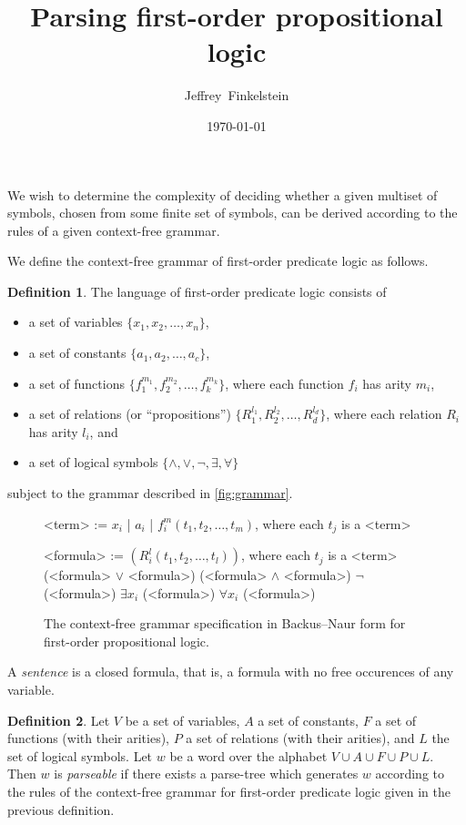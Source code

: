 \documentclass[draft]{article}
\author{Jeffrey~Finkelstein}
\title{Parsing first-order propositional logic}
\date{\today}
\theoremstyle{definition}
\newtheorem{definition}{Definition}
\begin{document}
\maketitle

We wish to determine the complexity of deciding whether a given multiset of symbols, chosen from some finite set of symbols, can be derived according to the rules of a given context-free grammar.

We define the context-free grammar of first-order predicate logic as follows.
\begin{definition}
  The language of first-order predicate logic consists of
  \begin{itemize}
  \item a set of variables $\{x_1, x_2, \ldots, x_n\}$,
  \item a set of constants $\{a_1, a_2, \ldots, a_c\}$,
  \item a set of functions $\{f^{m_1}_1, f^{m_2}_2, \ldots, f^{m_k}_k\}$, where each function $f_i$ has arity $m_i$,
  \item a set of relations (or ``propositions'') $\{R^{l_1}_1, R^{l_2}_2, \ldots, R^{l_d}_d\}$, where each relation $R_i$ has arity $l_i$, and
  \item a set of logical symbols $\{\land, \lor, \lnot, \exists, \forall\}$
  \end{itemize}
  subject to the grammar described in \autoref{fig:grammar}.
  \begin{figure}
    \caption{\label{fig:grammar}The context-free grammar specification in Backus--Naur form for first-order propositional logic.}
  \begin{grammar}
    <term> := $x_i$ | $a_i$ | $f^m_i(t_1, t_2, \ldots, t_m)$, where each $t_j$ is a <term>

    <formula> := $(R^l_i(t_1, t_2, \ldots, t_l))$, where each $t_j$ is a <term>
    \alt (<formula> $\lor$ <formula>)
    \alt (<formula> $\land$ <formula>)
    \alt $\lnot$ (<formula>)
    \alt $\exists x_i$ (<formula>)
    \alt $\forall x_i$ (<formula>)
  \end{grammar}
  \end{figure}
  A \emph{sentence} is a closed formula, that is, a formula with no free occurences of any variable.
\end{definition}
\begin{definition}
  Let $V$ be a set of variables, $A$ a set of constants, $F$ a set of functions (with their arities), $P$ a set of relations (with their arities), and $L$ the set of logical symbols.
  Let $w$ be a word over the alphabet $V\cup A\cup F\cup P\cup L$.
  Then $w$ is \emph{parseable} if there exists a parse-tree which generates $w$ according to the rules of the context-free grammar for first-order predicate logic given in the previous definition.
\end{definition}
\end{document}
